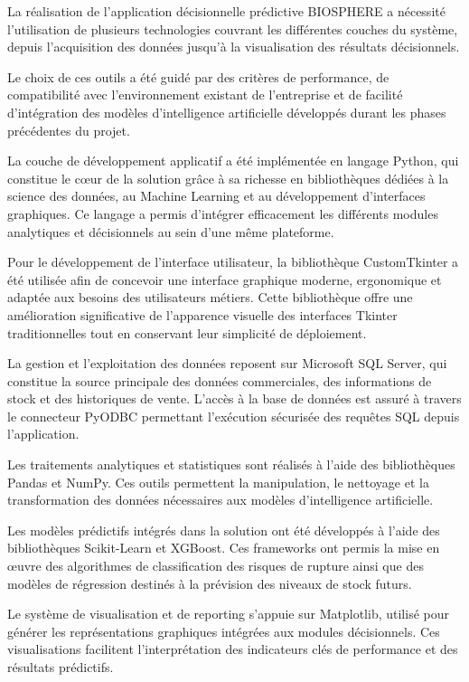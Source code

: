 La réalisation de l'application décisionnelle prédictive BIOSPHERE a nécessité l'utilisation de plusieurs technologies couvrant les différentes couches du système, depuis l'acquisition des données jusqu'à la visualisation des résultats décisionnels.

Le choix de ces outils a été guidé par des critères de performance, de compatibilité avec l'environnement existant de l'entreprise et de facilité d'intégration des modèles d'intelligence artificielle développés durant les phases précédentes du projet.

La couche de développement applicatif a été implémentée en langage Python, qui constitue le cœur de la solution grâce à sa richesse en bibliothèques dédiées à la science des données, au Machine Learning et au développement d'interfaces graphiques. Ce langage a permis d'intégrer efficacement les différents modules analytiques et décisionnels au sein d'une même plateforme.

Pour le développement de l'interface utilisateur, la bibliothèque CustomTkinter a été utilisée afin de concevoir une interface graphique moderne, ergonomique et adaptée aux besoins des utilisateurs métiers. Cette bibliothèque offre une amélioration significative de l'apparence visuelle des interfaces Tkinter traditionnelles tout en conservant leur simplicité de déploiement.

La gestion et l'exploitation des données reposent sur Microsoft SQL Server, qui constitue la source principale des données commerciales, des informations de stock et des historiques de vente. L'accès à la base de données est assuré à travers le connecteur PyODBC permettant l'exécution sécurisée des requêtes SQL depuis l'application.

Les traitements analytiques et statistiques sont réalisés à l'aide des bibliothèques Pandas et NumPy. Ces outils permettent la manipulation, le nettoyage et la transformation des données nécessaires aux modèles d'intelligence artificielle.

Les modèles prédictifs intégrés dans la solution ont été développés à l'aide des bibliothèques Scikit-Learn et XGBoost. Ces frameworks ont permis la mise en œuvre des algorithmes de classification des risques de rupture ainsi que des modèles de régression destinés à la prévision des niveaux de stock futurs.

Le système de visualisation et de reporting s'appuie sur Matplotlib, utilisé pour générer les représentations graphiques intégrées aux modules décisionnels. Ces visualisations facilitent l'interprétation des indicateurs clés de performance et des résultats prédictifs.

